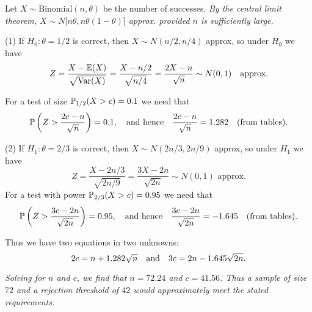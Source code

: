 \begin{solution}
Let $X\sim\text{Binomial}(n,\theta)$ be the number of successes. 
\bit
\it By the central limit theorem, $X\sim N\big[n\theta,n\theta(1-\theta)\big]$ approx. provided $n$ is sufficiently large.
\eit

(1) If $H_0:\theta=1/2$ is correct, then $X\sim N(n/2,n/4)$ approx, so under $H_0$ we have
\[
Z 	= \frac{X-\mathbb{E}(X)}{\sqrt{\text{Var}(X)}} 
	= \frac{X-n/2}{\sqrt{n/4}} 
	= \frac{2X-n}{\sqrt{n}} \sim N(0,1) \text{\quad approx.}
\]

For a test of size $\mathbb{P}_{1/2}(X>c) = 0.1$ we need that 
\[
\mathbb{P}\left(Z > \frac{2c-n}{\sqrt{n}}\right) = 0.1,
\quad\text{and hence}\quad
\frac{2c-n}{\sqrt{n}} = 1.282 \text{\quad (from tables).}
\]

(2) If $H_1:\theta=2/3$ is correct, then $X\sim N(2n/3,2n/9)$ approx, so under $H_1$ we have
\[
Z 	= \frac{X-2n/3}{\sqrt{2n/9}} 
	= \frac{3X-2n}{\sqrt{2n}} \sim N(0,1) \text{ approx.}
\]
For a test with power $\mathbb{P}_{2/3}(X>c) = 0.95$  we need that
\[
\mathbb{P}\left(Z > \frac{3c-2n}{\sqrt{2n}}\right) = 0.95,
\quad\text{and hence}\quad
\frac{3c-2n}{\sqrt{2n}} = -1.645 \text{\quad (from tables).}
\]

Thus we have two equations in two unknowns:
\[
2c = n + 1.282\sqrt{n} \text{\quad and\quad} 3c = 2n - 1.645\sqrt{2n}.
\]

\bit
\it Solving for $n$ and $c$, we find that $n=72.24$ and $c=41.56$.
\it Thus a sample of size $72$ and a rejection threshold of $42$ would approximately meet the stated requirements.
\eit
\end{solution}

